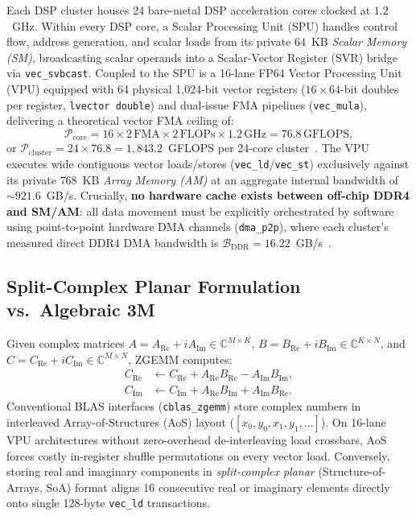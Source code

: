 \documentclass[journal]{IEEEtran}
\begin{document}
Each DSP cluster houses 24 bare-metal DSP acceleration cores clocked at $1.2$~GHz. Within every DSP core, a Scalar Processing Unit (SPU) handles control flow, address generation, and scalar loads from its private $64$~KB \emph{Scalar Memory (SM)}, broadcasting scalar operands into a Scalar-Vector Register (SVR) bridge via \texttt{vec\_svbcast}. Coupled to the SPU is a 16-lane FP64 Vector Processing Unit (VPU) equipped with 64 physical 1,024-bit vector registers ($16 \times 64$-bit doubles per register, \texttt{lvector double}) and dual-issue FMA pipelines (\texttt{vec\_mula}), delivering a theoretical vector FMA ceiling of:
\begin{equation}
\mathcal{P}_{\mathrm{core}} = 16 \times 2\,\text{FMA} \times 2\,\text{FLOPs} \times 1.2\,\text{GHz} = 76.8\,\text{GFLOPS},
\label{eq:core_peak}
\end{equation}
or $\mathcal{P}_{\mathrm{cluster}} = 24 \times 76.8 = 1{,}843.2$~GFLOPS per 24-core cluster~\cite{fang2026mtgemm}. The VPU executes wide contiguous vector loads/stores (\texttt{vec\_ld}/\texttt{vec\_st}) exclusively against its private $768$~KB \emph{Array Memory (AM)} at an aggregate internal bandwidth of $\sim\!921.6$~GB/s. Crucially, \textbf{no hardware cache exists between off-chip DDR4 and SM/AM}: all data movement must be explicitly orchestrated by software using point-to-point hardware DMA channels (\texttt{dma\_p2p}), where each cluster's measured direct DDR4 DMA bandwidth is $\mathcal{B}_{\mathrm{DDR}} = 16.22$~GB/s~\cite{qi2025constraint}.

\subsection{Split-Complex Planar Formulation vs.\ Algebraic 3M}
Given complex matrices $A = A_{\mathrm{Re}} + i A_{\mathrm{Im}} \in \mathbb{C}^{M \times K}$, $B = B_{\mathrm{Re}} + i B_{\mathrm{Im}} \in \mathbb{C}^{K \times N}$, and $C = C_{\mathrm{Re}} + i C_{\mathrm{Im}} \in \mathbb{C}^{M \times N}$, ZGEMM computes:
\begin{equation}
\begin{aligned}
C_{\mathrm{Re}} &\leftarrow C_{\mathrm{Re}} + A_{\mathrm{Re}} B_{\mathrm{Re}} - A_{\mathrm{Im}} B_{\mathrm{Im}}, \\
C_{\mathrm{Im}} &\leftarrow C_{\mathrm{Im}} + A_{\mathrm{Re}} B_{\mathrm{Im}} + A_{\mathrm{Im}} B_{\mathrm{Re}}.
\end{aligned}
\label{eq:zgemm_4m}
\end{equation}
Conventional BLAS interfaces (\texttt{cblas\_zgemm}) store complex numbers in interleaved Array-of-Structures (AoS) layout ($[x_0, y_0, x_1, y_1, \dots]$). On 16-lane VPU architectures without zero-overhead de-interleaving load crossbars, AoS forces costly in-register shuffle permutations on every vector load. Conversely, storing real and imaginary components in \emph{split-complex planar} (Structure-of-Arrays, SoA) format aligns 16 consecutive real or imaginary elements directly onto single 128-byte \texttt{vec\_ld} transactions.
\end{document}
